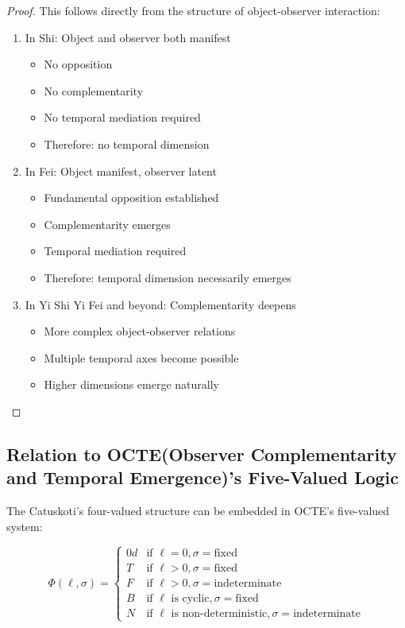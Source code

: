 \documentclass[12pt,a4paper]{article}
\begin{document}
\begin{proof}
This follows directly from the structure of object-observer interaction:
\begin{enumerate}
    \item In Shi: Object and observer both manifest
    \begin{itemize}
        \item No opposition
        \item No complementarity
        \item No temporal mediation required
        \item Therefore: no temporal dimension
    \end{itemize}

    \item In Fei: Object manifest, observer latent
    \begin{itemize}
        \item Fundamental opposition established
        \item Complementarity emerges
        \item Temporal mediation required
        \item Therefore: temporal dimension necessarily emerges
    \end{itemize}

    \item In Yi Shi Yi Fei and beyond: Complementarity deepens
    \begin{itemize}
        \item More complex object-observer relations
        \item Multiple temporal axes become possible
        \item Higher dimensions emerge naturally
    \end{itemize}
\end{enumerate}
\end{proof}

\subsection{Relation to OCTE(Observer Complementarity and Temporal Emergence)'s Five-Valued Logic}

The Catuskoti's four-valued structure can be embedded in OCTE's five-valued system:

\begin{equation}
\Phi(\ell, \sigma) =
\begin{cases}
0d & \text{if } \ell = 0, \sigma = \text{fixed} \\
T & \text{if } \ell > 0, \sigma = \text{fixed} \\
F & \text{if } \ell > 0, \sigma = \text{indeterminate} \\
B & \text{if } \ell \text{ is cyclic}, \sigma = \text{fixed} \\
N & \text{if } \ell \text{ is non-deterministic}, \sigma = \text{indeterminate}
\end{cases}
\end{equation}
\end{document}
